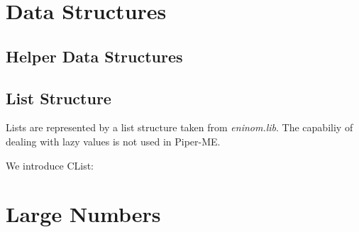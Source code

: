 


\chapter{Data Structures}

\section{Helper Data Structures}


\section{List Structure}

Lists are represented by a list structure taken from {\em eninom.lib}. The capabiliy
of dealing with lazy values is not used in Piper-ME.

We introduce CList:
 


\chapter{Large Numbers}





